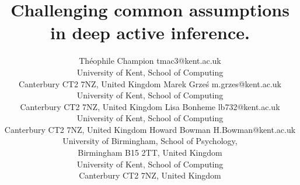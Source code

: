 \documentclass[twoside,11pt]{article}
\begin{document}
\title{Challenging common assumptions in deep active inference.}

\author{\name Théophile Champion \email tmac3@kent.ac.uk \\
       \addr University of Kent, School of Computing\\
       Canterbury CT2 7NZ, United Kingdom
       \AND
       \name Marek Grze\'s \email m.grzes@kent.ac.uk \\
       \addr University of Kent, School of Computing\\
       Canterbury CT2 7NZ, United Kingdom
       \AND
       \name Lisa Bonheme \email lb732@kent.ac.uk \\
       \addr University of Kent, School of Computing\\
       Canterbury CT2 7NZ, United Kingdom
       \AND
       \name Howard Bowman \email H.Bowman@kent.ac.uk \\
       \addr University of Birmingham, School of Psychology,\\
       Birmingham B15 2TT, United Kingdom\\
       University of Kent, School of Computing\\
       Canterbury CT2 7NZ, United Kingdom
       }
       

\maketitle
\end{document}
